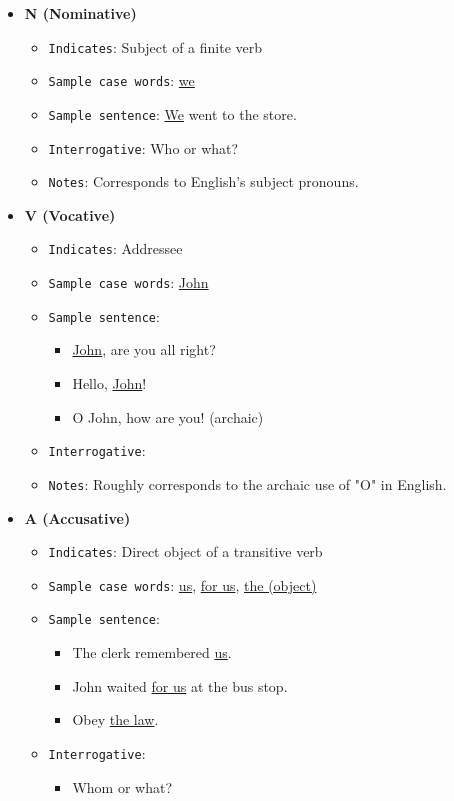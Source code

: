 \documentclass[11pt]{article}
\begin{document}
\begin{itemize}
\item \textbf{N (Nominative)}
\begin{itemize}
\item \texttt{Indicates}: Subject of a finite verb
\item \texttt{Sample case words}: \uline{we}
\item \texttt{Sample sentence}: \uline{We} went to the store.
\item \texttt{Interrogative}: Who or what?
\item \texttt{Notes}: Corresponds to English's subject pronouns.
\end{itemize}
\item \textbf{V (Vocative)}
\begin{itemize}
\item \texttt{Indicates}: Addressee
\item \texttt{Sample case words}: \uline{John}
\item \texttt{Sample sentence}:
\begin{itemize}
\item \uline{John}, are you all right?
\item Hello, \uline{John}!
\item O John, how are you! (archaic)
\end{itemize}
\item \texttt{Interrogative}:
\item \texttt{Notes}: Roughly corresponds to the archaic use of "O" in English.
\end{itemize}
\item \textbf{A (Accusative)}
\begin{itemize}
\item \texttt{Indicates}: Direct object of a transitive verb
\item \texttt{Sample case words}: \uline{us}, \uline{for us}, \uline{the (object)}
\item \texttt{Sample sentence}:
\begin{itemize}
\item The clerk remembered \uline{us}.
\item John waited \uline{for us} at the bus stop.
\item Obey \uline{the law}.
\end{itemize}
\item \texttt{Interrogative}:
\begin{itemize}
\item Whom or what?
\end{itemize}

\end{itemize}
\end{itemize}
\end{document}
